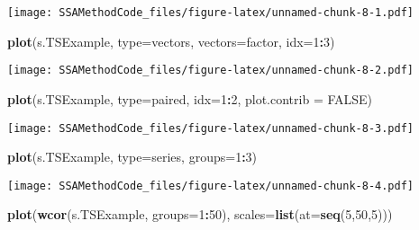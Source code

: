 \documentclass[
]{article}
\newenvironment{Shaded}{\begin{snugshade}}{\end{snugshade}}
\newcommand{\AttributeTok}[1]{\textcolor[rgb]{0.13,0.29,0.53}{#1}}
\newcommand{\ConstantTok}[1]{\textcolor[rgb]{0.56,0.35,0.01}{#1}}
\newcommand{\DecValTok}[1]{\textcolor[rgb]{0.00,0.00,0.81}{#1}}
\newcommand{\FunctionTok}[1]{\textcolor[rgb]{0.13,0.29,0.53}{\textbf{#1}}}
\newcommand{\NormalTok}[1]{#1}
\newcommand{\SpecialCharTok}[1]{\textcolor[rgb]{0.81,0.36,0.00}{\textbf{#1}}}
\newcommand{\StringTok}[1]{\textcolor[rgb]{0.31,0.60,0.02}{#1}}
\begin{document}
\texttt{[image: SSAMethodCode\_files/figure-latex/unnamed-chunk-8-1.pdf]}

\begin{Shaded}
\begin{Highlighting}[]
\FunctionTok{plot}\NormalTok{(s.TSExample, }\AttributeTok{type=}\StringTok{\textquotesingle{}vectors\textquotesingle{}}\NormalTok{, }\AttributeTok{vectors=}\StringTok{\textquotesingle{}factor\textquotesingle{}}\NormalTok{, }\AttributeTok{idx=}\DecValTok{1}\SpecialCharTok{:}\DecValTok{3}\NormalTok{)}
\end{Highlighting}
\end{Shaded}

\texttt{[image: SSAMethodCode\_files/figure-latex/unnamed-chunk-8-2.pdf]}

\begin{Shaded}
\begin{Highlighting}[]
\FunctionTok{plot}\NormalTok{(s.TSExample, }\AttributeTok{type=}\StringTok{\textquotesingle{}paired\textquotesingle{}}\NormalTok{, }\AttributeTok{idx=}\DecValTok{1}\SpecialCharTok{:}\DecValTok{2}\NormalTok{, }\AttributeTok{plot.contrib =} \ConstantTok{FALSE}\NormalTok{)}
\end{Highlighting}
\end{Shaded}

\texttt{[image: SSAMethodCode\_files/figure-latex/unnamed-chunk-8-3.pdf]}

\begin{Shaded}
\begin{Highlighting}[]
\FunctionTok{plot}\NormalTok{(s.TSExample, }\AttributeTok{type=}\StringTok{\textquotesingle{}series\textquotesingle{}}\NormalTok{, }\AttributeTok{groups=}\DecValTok{1}\SpecialCharTok{:}\DecValTok{3}\NormalTok{)}
\end{Highlighting}
\end{Shaded}

\texttt{[image: SSAMethodCode\_files/figure-latex/unnamed-chunk-8-4.pdf]}

\begin{Shaded}
\begin{Highlighting}[]
\FunctionTok{plot}\NormalTok{(}\FunctionTok{wcor}\NormalTok{(s.TSExample, }\AttributeTok{groups=}\DecValTok{1}\SpecialCharTok{:}\DecValTok{50}\NormalTok{), }\AttributeTok{scales=}\FunctionTok{list}\NormalTok{(}\AttributeTok{at=}\FunctionTok{seq}\NormalTok{(}\DecValTok{5}\NormalTok{,}\DecValTok{50}\NormalTok{,}\DecValTok{5}\NormalTok{)))}
\end{Highlighting}
\end{Shaded}
\end{document}
